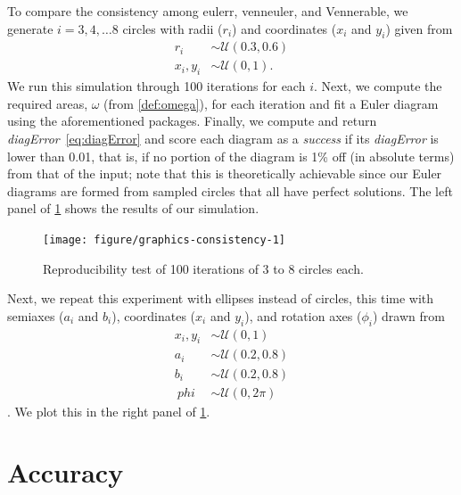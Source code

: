 \documentclass[a4paper,nofonts,nobib,titlepage,justified,marginals=raggedouter,nohyper]{tufte-handout}\usepackage[]{graphicx}\usepackage[]{color}
\newenvironment{knitrout}{}{} %
\newcommand{\pkg}[1]{{\fontseries{b}\selectfont #1}}
\begin{document}
To compare the consistency among \pkg{eulerr}, \pkg{venneuler}, and
\pkg{Vennerable}, we generate $i=3,4,\dots 8$ circles with radii ($r_i$) and
coordinates ($x_i$ and $y_i$) given from
\begin{align*}
r_i     & \sim \mathcal{U}(0.3, 0.6)\\
x_i,y_i & \sim \mathcal{U}(0, 1).
\end{align*}
We run this simulation through 100 iterations for each $i$. Next, we compute the
required areas, $\omega$ (from \cref{def:omega}), for each iteration and
fit a Euler diagram using the aforementioned packages. Finally,
we compute and return \emph{diagError}~\eqref{eq:diagError} and score each
diagram as a \emph{success} if its \emph{diagError} is lower than 0.01, that is,
if no portion of the diagram is 1\% off (in absolute terms) from that of the
input; note that this is theoretically achievable since our Euler diagrams are
formed from sampled circles that all have perfect solutions. The left panel of
\cref{fig:consistency} shows the results of our simulation.

\begin{knitrout}
\color{fgcolor}\begin{figure}

{\centering \texttt{[image: figure/graphics-consistency-1]} 

}

\caption[Reproducibility test of 100 iterations of 3 to 8 circles each]{Reproducibility test of 100 iterations of 3 to 8 circles each.}\label{fig:consistency}
\end{figure}


\end{knitrout}

Next, we repeat this experiment with ellipses instead of
circles, this time with semiaxes ($a_i$ and $b_i$), coordinates
($x_i$ and $y_i$), and rotation axes ($\phi_i$) drawn from
\begin{align*}
x_i,y_i & \sim \mathcal{U}(0, 1)\\
a_i     & \sim \mathcal{U}(0.2, 0.8)\\
b_i     & \sim \mathcal{U}(0.2, 0.8)\\\
phi     & \sim \mathcal{U}(0, 2\pi)
\end{align*}. We plot this in the right panel of \cref{fig:consistency}.

\section{Accuracy}
\label{sec:accuracy}
\end{document}
